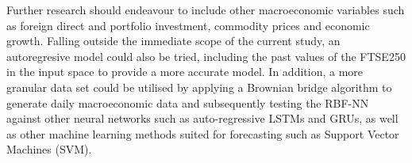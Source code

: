 \documentclass[11pt,a4paper]{article}
\begin{document}
Further research should endeavour to include other macroeconomic variables such as 
foreign direct and portfolio investment, commodity prices and economic growth.
Falling outside the immediate scope of the current study, 
an autoregresive model could also be tried, including the past values of the 
FTSE250 in the input space to provide a more accurate model. In addition, 
a more granular data set could be utilised by applying a 
Brownian bridge algorithm to generate daily macroeconomic data and 
subsequently testing the RBF-NN against other neural networks 
such as auto-regressive LSTMs and GRUs, as well as other machine learning methods suited for 
forecasting such as Support Vector Machines (SVM). 



\end{document}
